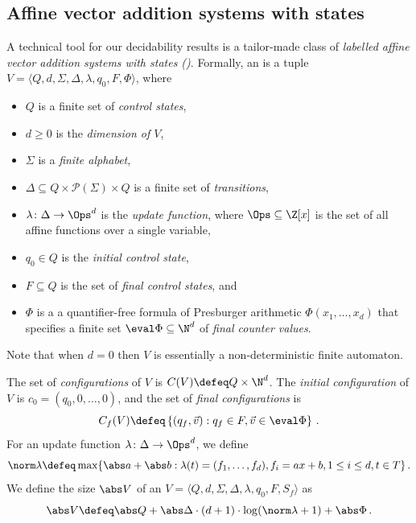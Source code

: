 \subsection{Affine vector addition systems with states}
A technical tool for our decidability results is a tailor-made class
of \emph{labelled affine vector addition systems with states
  (\laVASS)}. Formally, an \laVASS is a tuple $V=\langle Q,d,
\Sigma,\Delta,\lambda,q_0,F,\Phi\rangle$, where
%
\begin{itemize}
\item $Q$ is a finite set of \emph{control states},
\item $d\ge 0$ is the \emph{dimension of $V$},
\item $\Sigma$ is a \emph{finite alphabet},
\item $\Delta \subseteq Q\times \mathcal P(\Sigma) \times Q$ is a
  finite set of \emph{transitions},
\item $\lambda\colon \Delta \to \Ops^d$ is the \emph{update function},
  where $\Ops \subseteq \Z[x]$ is the set of all affine functions over
  a single variable,
\item $q_0\in Q$ is the \emph{initial control state},
\item $F\subseteq Q$ is the set of \emph{final control states}, and
\item $\Phi$ is a a quantifier-free formula of Presburger arithmetic
  $\Phi(x_1,\ldots,x_d)$ that specifies a finite set $\eval
  \Phi\subseteq \N^d$ of \emph{final counter values}.
\end{itemize}
%
Note that when $d=0$ then $V$ is essentially a non-deterministic
finite automaton.

The set of \emph{configurations} of $V$ is $C(V)\defeq Q\times
\N^d$. The \emph{initial configuration} of $V$ is
$c_0=(q_0,0,\ldots,0)$, and the set of \emph{final configurations}
is \[C_f(V) \defeq \left \{ (q_f,\vec v) : q_f\in F,\vec v\in \eval\Phi
\right \}\,.\]
%
For an update function $\lambda\colon \Delta \to \Ops^d$,
we define
\[
\norm \lambda \defeq \max \{ \abs a +\abs b :
\lambda(t)=(f_1,\ldots,f_d), f_i = a x + b, 1\le i\le d, t\in T\}\,.
\]
%
We define the size $\abs V$ of an \laVASS $V=\langle Q,d,
\Sigma,\Delta,\lambda,q_0,F,S_f\rangle$ as
%
\[
\abs V \defeq \abs Q + \abs \Delta \cdot (d+1) \cdot \log (\norm \lambda + 1) +
\abs \Phi \,.
\]

